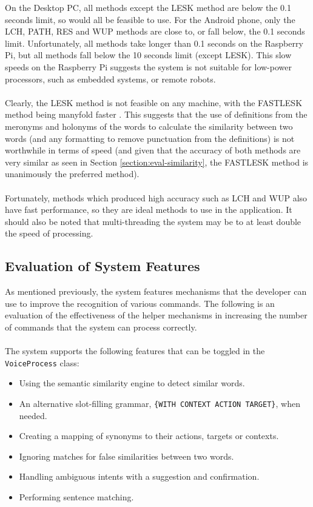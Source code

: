 \documentclass[11pt]{article}
\begin{document}
On the Desktop PC, all methods except the LESK method are below the 0.1 seconds limit, so would all be feasible to use. For the Android phone, only the LCH, PATH, RES and WUP methods are close to, or fall below, the 0.1 seconds limit. Unfortunately, all methods take longer than 0.1 seconds on the Raspberry Pi, but all methods fall below the 10 seconds limit (except LESK). This slow speeds on the Raspberry Pi suggests the system is not suitable for low-power processors, such as embedded systems, or remote robots.
\\
\\
Clearly, the LESK method is not feasible on any machine, with the FASTLESK method being manyfold faster . This suggests that the use of definitions from the meronyms and holonyms of the words to calculate the similarity between two words (and any formatting to remove punctuation from the definitions) is not worthwhile in terms of speed (and given that the accuracy of both methods are very similar as seen in Section \ref{section:eval-similarity}, the FASTLESK method is unanimously the preferred method).
\\
\\
Fortunately, methods which produced high accuracy such as LCH and WUP also have fast performance, so they are ideal methods to use in the application. It should also be noted that multi-threading the system may be to at least double the speed of processing.

\subsection{Evaluation of System Features}

As mentioned previously, the system features mechanisms that the developer can use to improve the recognition of various commands. The following is an evaluation of the effectiveness of the helper mechanisms in increasing the number of commands that the system can process correctly.
\\
\\
The system supports the following features that can be toggled in the \texttt{VoiceProcess} class:

\begin{itemize}
\item Using the semantic similarity engine to detect similar words.
\item An alternative slot-filling grammar, \texttt{\{WITH CONTEXT ACTION TARGET\}}, when needed.
\item Creating a mapping of synonyms to their actions, targets or contexts.
\item Ignoring matches for false similarities between two words.
\item Handling ambiguous intents with a suggestion and confirmation.
\item Performing sentence matching.
\end{itemize}
\end{document}
